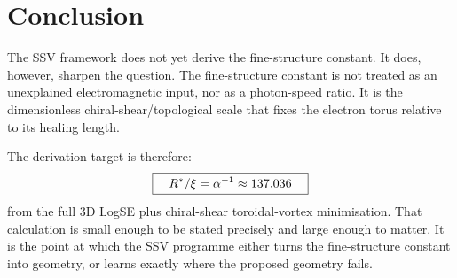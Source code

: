 \documentclass[11pt,a4paper]{article}
\begin{document}
\section{Conclusion}
\label{sec:conclusion}

The SSV framework does not yet derive the fine-structure constant.  It
does, however, sharpen the question.  The fine-structure constant is not
treated as an unexplained electromagnetic input, nor as a photon-speed
ratio.  It is the dimensionless chiral-shear/topological scale that fixes
the electron torus relative to its healing length.

The derivation target is therefore:
\[
    \boxed{\quad R^*/\xi = \alpha^{-1} \approx 137.036 \quad}
\]
from the full 3D LogSE plus chiral-shear toroidal-vortex minimisation.
That calculation is small enough to be stated precisely and large enough to
matter.  It is the point at which the SSV programme either turns the
fine-structure constant into geometry, or learns exactly where the proposed
geometry fails.



\end{document}
